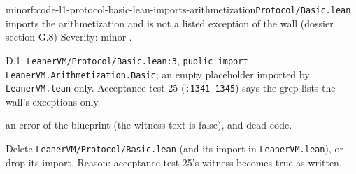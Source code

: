 \begin{finding}{minor}{f:code-l1-protocol-basic-lean-imports-arithmetization}{\texttt{Protocol/\allowbreak{}Basic.\allowbreak{}lean} imports the arithmetization and is not a listed exception of the wall (dossier section G.8)}
Severity: minor .

D.1: \texttt{L\allowbreak{}e\allowbreak{}a\allowbreak{}n\allowbreak{}e\allowbreak{}r\allowbreak{}V\allowbreak{}M\allowbreak{}/\allowbreak{}P\allowbreak{}r\allowbreak{}o\allowbreak{}t\allowbreak{}o\allowbreak{}c\allowbreak{}o\allowbreak{}l\allowbreak{}/\allowbreak{}B\allowbreak{}a\allowbreak{}s\allowbreak{}i\allowbreak{}c\allowbreak{}.\allowbreak{}l\allowbreak{}e\allowbreak{}a\allowbreak{}n\allowbreak{}:\allowbreak{}3}, \texttt{p\allowbreak{}u\allowbreak{}b\allowbreak{}l\allowbreak{}i\allowbreak{}c\allowbreak{} i\allowbreak{}m\allowbreak{}p\allowbreak{}o\allowbreak{}r\allowbreak{}t\allowbreak{} L\allowbreak{}e\allowbreak{}a\allowbreak{}n\allowbreak{}e\allowbreak{}r\allowbreak{}V\allowbreak{}M\allowbreak{}.\allowbreak{}A\allowbreak{}r\allowbreak{}i\allowbreak{}t\allowbreak{}h\allowbreak{}m\allowbreak{}e\allowbreak{}t\allowbreak{}i\allowbreak{}z\allowbreak{}a\allowbreak{}t\allowbreak{}i\allowbreak{}o\allowbreak{}n\allowbreak{}.\allowbreak{}B\allowbreak{}a\allowbreak{}s\allowbreak{}i\allowbreak{}c}; an empty placeholder imported by \texttt{LeanerVM.\allowbreak{}lean} only. Acceptance test 25 (\texttt{:1341-{}1345}) says the grep lists the wall's exceptions only.

an error of the blueprint (the witness text is false), and dead code.

Delete \texttt{LeanerVM/\allowbreak{}Protocol/\allowbreak{}Basic.\allowbreak{}lean} (and its import in \texttt{LeanerVM.\allowbreak{}lean}), or drop its import. Reason: acceptance test 25's witness becomes true as written.

\end{finding}

